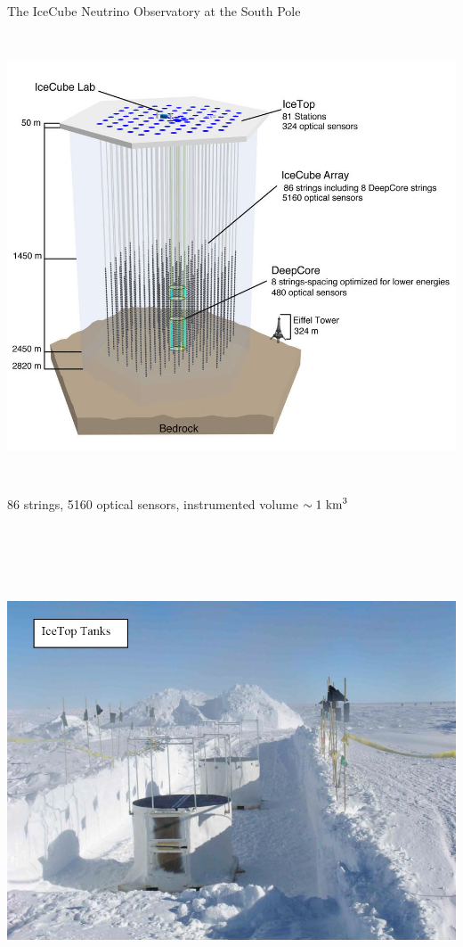 \Tr
\onecolumn
\begin{center}
{\blue The IceCube Neutrino Observatory at the South Pole}\\
\includegraphics[keepaspectratio,height=14cm]{ic86-dc}\\
86 strings, 5160 optical sensors, instrumented volume $\sim 1~\rm{km}^{3}$
\end{center}

\Tr
\onecolumn
\begin{center}
\includegraphics[keepaspectratio,height=14.5cm]{icetop-snow}
\end{center}

